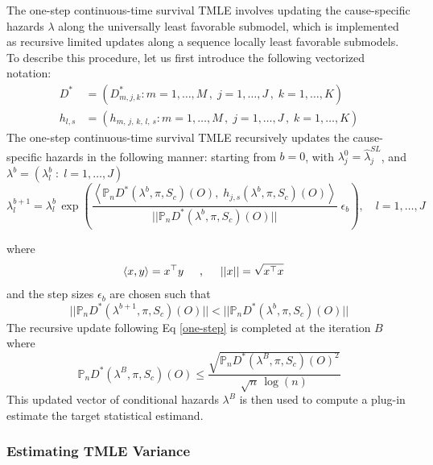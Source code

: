 \documentclass{report}
\newcommand{\1}{\ensuremath{\mathbf{1}}}
\newcommand{\lj}{\ensuremath{l}}
\newcommand{\jj}{\ensuremath{j}}
\newcommand{\g}{\ensuremath{\pi}}
\begin{document}
The one-step continuous-time survival TMLE involves updating the cause-specific hazards \(\lambda\) along the universally least favorable submodel, which is implemented as recursive limited updates along a sequence locally least favorable submodels. To describe this procedure, let us first introduce the following vectorized notation:
\begin{align*}
{D}^{*} &= \left(D^*_{m, \jj, k} : m = 1,\dots,M \,,\; \jj=1,\dots,J \,,\; k=1,\dots,K\right)\\
h_{\lj, s} &= \left(h_{m,\, \jj,\, k,\, \lj,\, s} : m = 1,\dots,M \,,\; \jj=1,\dots,J \,,\; k=1,\dots,K\right)
\end{align*}
The one-step continuous-time survival TMLE recursively updates the cause-specific hazards in the following manner: starting from \(b=0\), with \(\lambda^0_j = \hat{\lambda}^{SL}_j\), and \(\lambda^b = \left(\lambda^b_l \;:\; l = 1, \dots, J\right)\)
\begin{equation}
\lambda^{b+1}_{l} = \lambda^{b}_l \, \exp \left( \frac{\left<\mathbb{P}_n {D}^*( \lambda^b, \g,  S_c)(O),\; h_{j, s}( \lambda^b, \g,  S_c)(O) \right>}{|| \mathbb{P}_n {D}^*( \lambda^b, \g, S_c)(O)||} \; \epsilon_b\right), \quad l = 1,\dots,J \label{one-step}
\end{equation}

where
\begin{align*}
\left<x , y \right>& = x^\top y \hspace{.5cm}, \hspace{.5cm} ||x|| = \sqrt{x^\top x}
\end{align*}
and the step sizes \(\epsilon_b\) are chosen such that
\[|| \mathbb{P}_n {D}^*( \lambda^{b+1}, \g, S_c)(O)|| < || \mathbb{P}_n {D}^*( \lambda^{b}, \g, S_c)(O)||\]
The recursive update following Eq \eqref{one-step} is completed at the iteration \(B\) where
\begin{equation}
\mathbb{P}_n {D}^*( \lambda^B, \g, S_c)(O) \leq \frac{\sqrt{\mathbb{P}_n {D}^*( \lambda^B, \g, S_c)(O)^2}}{\sqrt{n} \, \log(n)} \label{one-step-stop}
\end{equation}
This updated vector of conditional hazards \(\lambda^B\) is then used to compute a plug-in estimate the target statistical estimand. 

\subsubsection{Estimating TMLE Variance}
\label{sec:org478189d}
\end{document}
